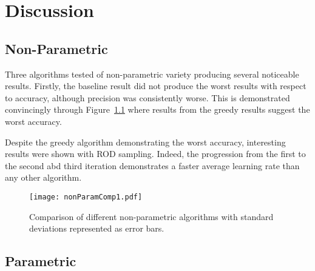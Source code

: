 \chapter{Discussion}


\graphicspath{{Chapter5/Figs/Vector/}{Chapter5/Figs/}}


\section{Non-Parametric}
Three algorithms tested of non-parametric variety producing several noticeable results. Firstly, the baseline result did not produce the worst results with respect to accuracy, although precision was consistently worse. This is demonstrated convincingly through Figure~\ref{fig:nPComp} where results from the greedy results suggest the worst accuracy.

Despite the greedy algorithm demonstrating the worst accuracy, interesting results were shown with ROD sampling. Indeed, the progression from the first to the second abd third iteration demonstrates a faster average learning rate than any other algorithm.

\begin{figure}[h]
    \begin{center}
        \texttt{[image: nonParamComp1.pdf]}
        \caption[Non-parametric comparison]{Comparison of different non-parametric algorithms with standard deviations represented as error bars.}
        \label{fig:nPComp}
    \end{center}
\end{figure}
\section{Parametric}
\blindtext[3]

